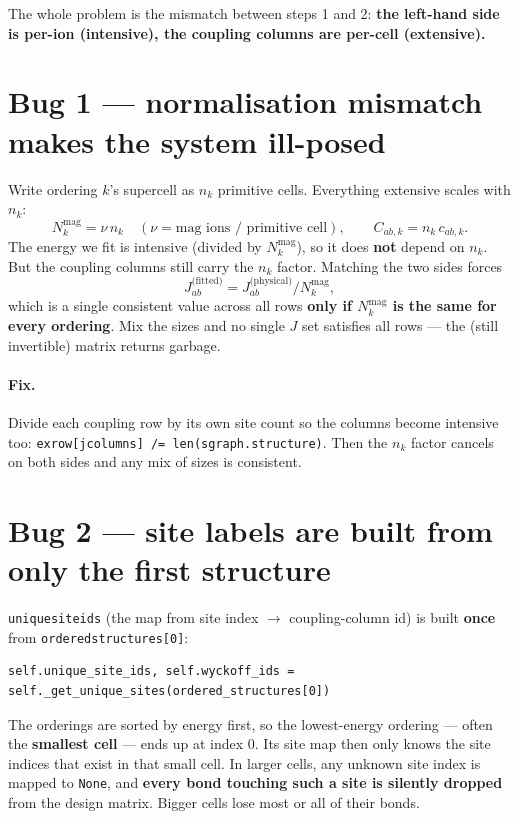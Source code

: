 \documentclass[11pt]{article}
\newcommand{\code}[1]{\texttt{\def\_{\textunderscore\allowbreak}#1}}
\begin{document}
The whole problem is the mismatch between steps 1 and 2: \textbf{the left-hand
side is per-ion (intensive), the coupling columns are per-cell (extensive).}

\section{Bug 1 --- normalisation mismatch makes the system ill-posed}
\label{sec:bug1}

Write ordering $k$'s supercell as $n_k$ primitive cells. Everything extensive
scales with $n_k$:
\[
  N_k^{\mathrm{mag}} = \nu\,n_k \quad(\nu=\text{mag ions / primitive cell}),
  \qquad
  C_{ab,k} = n_k\,c_{ab,k}.
\]
The energy we fit is intensive (divided by $N_k^{\mathrm{mag}}$), so it does
\textbf{not} depend on $n_k$. But the coupling columns still carry the $n_k$
factor. Matching the two sides forces
\[
  J_{ab}^{\text{(fitted)}} = J_{ab}^{\text{(physical)}} / N_k^{\mathrm{mag}},
\]
which is a single consistent value across all rows \textbf{only if
$N_k^{\mathrm{mag}}$ is the same for every ordering}. Mix the sizes and no single
$J$ set satisfies all rows --- the (still invertible) matrix returns garbage.

\paragraph{Fix.} Divide each coupling row by its own site count so the columns
become intensive too: \code{ex\_row[j\_columns] /= len(sgraph.structure)}. Then
the $n_k$ factor cancels on both sides and any mix of sizes is consistent.

\section{Bug 2 --- site labels are built from only the first structure}
\label{sec:bug2}

\code{unique\_site\_ids} (the map from site index $\to$ coupling-column id) is
built \textbf{once} from \code{ordered\_structures[0]}:
\begin{lstlisting}
self.unique_site_ids, self.wyckoff_ids = self._get_unique_sites(ordered_structures[0])
\end{lstlisting}
The orderings are sorted by energy first, so the lowest-energy ordering --- often
the \textbf{smallest cell} --- ends up at index 0. Its site map then only knows
the site indices that exist in that small cell. In larger cells, any unknown site
index is mapped to \code{None}, and \textbf{every bond touching such a site is
silently dropped} from the design matrix. Bigger cells lose most or all of their
bonds.
\end{document}

